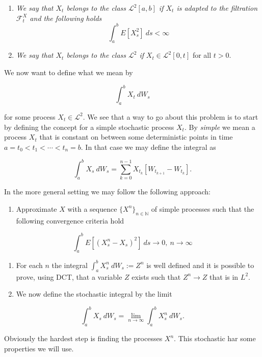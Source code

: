 \documentclass[
]{article}
\providecommand{\tightlist}{%
  \setlength{\itemsep}{0pt}\setlength{\parskip}{0pt}}
\begin{document}
\begin{enumerate}
\def\labelenumi{\roman{enumi}.}
\tightlist
\item
  \emph{We say that \(X_t\) belongs to the class \(\mathcal{L}^2[a,b]\)
  if \(X_t\) is adapted to the filtration \(\mathcal{F}^X_t\) and the
  following holds} \[\int_a^bE[X_s^2]\ ds<\infty\]
\item
  \emph{We say that \(X_t\) belongs to the class \(\mathcal{L}^2\) if}
  \(X_t\in\mathcal{L}^2[0,t]\) for all \(t>0\).
\end{enumerate}

We now want to define what we mean by

\[
\int_a^bX_t\ dW_s
\]

for some process \(X_t\in\mathcal{L}^2\). We see that a way to go about
this problem is to start by defining the concept for a simple stochastic
process \(X_t\). By \emph{simple} we mean a process \(X_t\) that is
constant on between some deterministic points in time
\(a=t_0<t_1<\cdots<t_n=b\). In that case we may define the integral as

\[
\int_a^bX_s\ dW_s = \sum_{k=0}^{n-1}X_{t_k}[W_{t_{k+1}}-W_{t_k}].\tag{4.8}
\]

In the more general setting we may follow the following approach:

\begin{enumerate}
\def\labelenumi{\arabic{enumi}.}
\tightlist
\item
  Approximate \(X\) with a sequence \(\{X^n\}_{n\in\mathbb{N}}\) of
  simple processes such that the following convergence criteria hold
\end{enumerate}

\[
  \int_a^bE[(X_s^n-X_s)^2]\ ds\to 0,\ n\to\infty
  \]

\begin{enumerate}
\def\labelenumi{\arabic{enumi}.}
\setcounter{enumi}{1}
\tightlist
\item
  For each \(n\) the integral \(\int_a^b X_s^n\ dW_s:=Z^n\) is well
  defined and it is possible to prove, using DCT, that a variable \(Z\)
  exists such that \(Z^n\to Z\) that is in \(L^2\).
\item
  We now define the stochastic integral by the limit
\end{enumerate}

\[
  \int_a^b X_s\ dW_s=\lim_{n\to \infty}\int_a^b X_s^n\ dW_s.\tag{4.9}
  \]

Obviously the hardest step is finding the processes \(X^n\). This
stochastic har some properties we will use.
\end{document}
